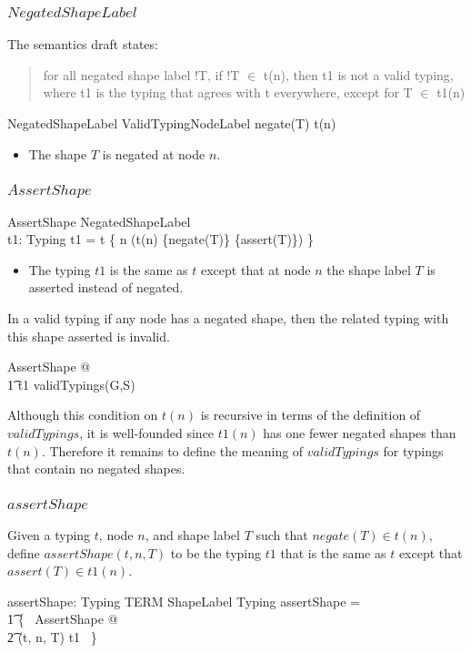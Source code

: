 \documentclass{article}
\begin{document}
\subsubsection{$NegatedShapeLabel$}
The semantics draft states:
\begin{quote}
for all negated shape label !T, if !T $\in$ t(n), then t1 is not a valid typing, where t1 is the typing that agrees with t everywhere, except for T $\in$ t1(n)
\end{quote}
\begin{schema}{NegatedShapeLabel}
	ValidTypingNodeLabel
\where
	negate(T) \in t(n)
\end{schema}
\begin{itemize}
\item The shape $T$ is negated at node $n$.
\end{itemize}

\subsubsection{$AssertShape$}
\begin{schema}{AssertShape}
	NegatedShapeLabel \\
	t1: Typing
\where
	t1 = t \oplus \{ n \mapsto (t(n) \setminus \{negate(T)\} \cup \{assert(T)\}) \}
\end{schema}
\begin{itemize}
\item The typing $t1$ is the same as $t$ except that at node $n$ the shape label $T$ is asserted instead of negated.
\end{itemize}

In a valid typing if any node has a negated shape, then the related typing with this shape asserted is invalid.
\begin{zed}
	\forall AssertShape @ \\
\t1		t1 \notin validTypings(G,S)
\end{zed}
Although this condition on $t(n)$ is recursive in terms of the definition of $validTypings$, 
it is well-founded since $t1(n)$ has one fewer negated shapes than $t(n)$. 
Therefore it remains to define the meaning of $validTypings$ for typings that contain no negated shapes.

\subsubsection{$assertShape$}
Given a typing $t$, node $n$, and shape label $T$ such that $negate(T) \in t(n)$, define $assertShape(t,n,T)$ to be the typing $t1$
that is the same as $t$ except that $assert(T) \in t1(n)$.
\begin{axdef}
	assertShape: Typing \cross TERM \cross ShapeLabel \pfun Typing
\where
	assertShape = \\
\t1		\{~ AssertShape @ \\
\t2			(t, n, T) \mapsto t1 ~\}
\end{axdef}
\end{document}
